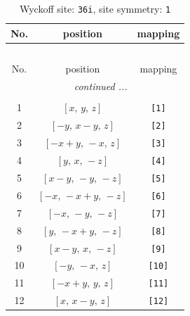 \documentclass[fleqn,8pt]{jsarticle}
\begin{document}
\renewcommand{\arraystretch}{1.2}
\begin{longtable}{ccc}
\caption{Wyckoff site: {\tt 36i}, site symmetry: {\tt 1}}
 \\
 \hline \hline
No. & position & mapping \\ \hline \endfirsthead

\multicolumn{2}{l}{\tablename\ \thetable{}} \\
 \hline \hline
No. & position & mapping \\ \hline \endhead

 \hline \hline
\multicolumn{2}{r}{\footnotesize\it continued ...} \\ \endfoot

 \hline \hline
\multicolumn{2}{r}{} \\ \endlastfoot

1 & $\left[ x,\, y,\, z \right]$ & {\tt [1]} \\ \hline
2 & $\left[ - y,\, x - y,\, z \right]$ & {\tt [2]} \\ \hline
3 & $\left[ - x + y,\, - x,\, z \right]$ & {\tt [3]} \\ \hline
4 & $\left[ y,\, x,\, - z \right]$ & {\tt [4]} \\ \hline
5 & $\left[ x - y,\, - y,\, - z \right]$ & {\tt [5]} \\ \hline
6 & $\left[ - x,\, - x + y,\, - z \right]$ & {\tt [6]} \\ \hline
7 & $\left[ - x,\, - y,\, - z \right]$ & {\tt [7]} \\ \hline
8 & $\left[ y,\, - x + y,\, - z \right]$ & {\tt [8]} \\ \hline
9 & $\left[ x - y,\, x,\, - z \right]$ & {\tt [9]} \\ \hline
10 & $\left[ - y,\, - x,\, z \right]$ & {\tt [10]} \\ \hline
11 & $\left[ - x + y,\, y,\, z \right]$ & {\tt [11]} \\ \hline
12 & $\left[ x,\, x - y,\, z \right]$ & {\tt [12]} \\
\end{longtable}
\end{document}
